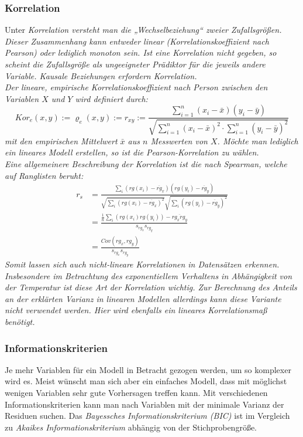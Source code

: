 \subsubsection{Korrelation}
Unter \it{Korrelation} versteht man die „Wechselbeziehung“ zweier Zufallsgrößen.
Dieser Zusammenhang kann entweder \it{linear} (Korrelationskoeffizient nach Pearson) oder lediglich \it{monoton} sein.
Ist eine Korrelation nicht gegeben, so scheint die Zufallsgröße als ungeeigneter Prädiktor für die jeweils andere Variable.
Kausale Beziehungen erfordern Korrelation.
\\
Der \it{lineare, empirische Korrelationskoeffizient nach Person} zwischen den Variablen $X$ und $Y$ wird definiert durch:
\begin{equation}
	Kor_e(x,y) := \varrho_e(x,y) := r_{xy} := \frac{
		\sum_{i=1}^n(x_i-\bar x)(y_i-\bar y)
	}{
	\sqrt{
		\sum_{i=1}^n(x_i-\bar x)^2\cdot
		\sum_{i=1}^n(y_i-\bar y)^2
	}
	}
\end{equation}
mit den empirischen Mittelwert $\bar x$ aus $n$ Messwerten von $X$.
Möchte man lediglich ein \it{lineares} Modell erstellen, so ist die Pearson-Korrelation zu wählen.
\\
Eine allgemeinere Beschreibung der Korrelation ist die nach \it{Spearman}, welche auf Ranglisten beruht:\\
\begin{align}
	r_s &= \frac{\sum_{i}(rg(x_i)-\overline{rg}_x)(rg(y_i)-\overline{rg}_y)} {\sqrt{\sum_{i}(rg(x_i)-\overline{rg}_x) ^2}\sqrt{\sum_{i}(rg(y_i)-\overline{rg}_y)^2}}\\
	&= \frac { \frac{1}{n} \sum_{i}(rg(x_{i})  rg(y_{i})) - \overline{rg_x rg_y}  }{s_{rg_x} s_{rg_y}} \\
	&= \frac {{Cov}(rg_{x},rg_{y} )} { s_{rg_x} s_{rg_y} }
\end{align}
Somit lassen sich auch nicht-lineare Korrelationen in Datensätzen erkennen.
Insbesondere im Betrachtung des exponentiellem Verhaltens in Abhängigkeit von der Temperatur ist diese Art der Korrelation wichtig.
Zur Berechnung des Anteils an der \it{erklärten} Varianz in linearen Modellen allerdings kann diese Variante nicht verwendet werden.
Hier wird ebenfalls ein lineares Korrelationsmaß benötigt.

\subsubsection{Informationskriterien}

Je mehr Variablen für ein Modell in Betracht gezogen werden, um so komplexer wird es. Meist wünscht man sich aber ein einfaches Modell, dass mit möglichst wenigen Variablen sehr gute Vorhersagen treffen kann. Mit verschiedenen Informationskriterien kann man nach Variablen mit der minimale Varianz der Residuen suchen. Das \emph{Bayessches Informationskriterium (BIC)} ist im Vergleich zu \emph{Akaikes Informationskriterium} abhängig von der Stichprobengröße.

